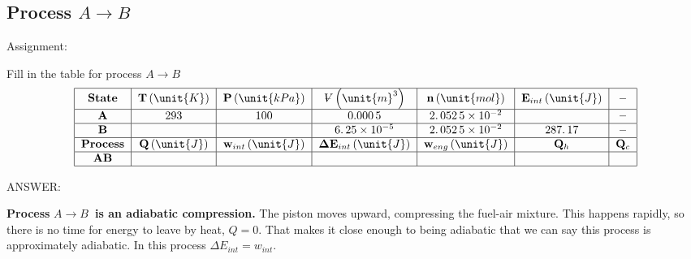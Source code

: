 \documentclass{article}
\begin{document}
\pagebreak

\subsection{\textbf{Process }$A\rightarrow B$}


Assignment:

Fill in the table for process $A\rightarrow B$%
\[
\begin{tabular}{|c|c|c|c|c|c|c|}
\hline
\textbf{State} & $\mathbf{T}\left( \unit{K}\right) $ & $\mathbf{P}\left( 
\unit{kPa}\right) $ & $%
\ooalign{\hfil$V$\hfil\cr\kern0.1em--\hfil\cr}%
\left( \unit{m}^{3}\right) $ & $\mathbf{n}\left( \unit{mol}\right) $ & $%
\mathbf{E}_{int}\left( \unit{J}\right) $ & \textbf{--} \\ \hline
$\mathbf{A}$ & $293$ & $100$ & $0.000\,5$ & $2.\,052\,5\times 10^{-2}$ &  & 
\textbf{--} \\ \hline
$\mathbf{B}$ &  &  & $6.\,25\times 10^{-5}$ & $2.\,052\,5\times 10^{-2}$ & $%
287.\,\allowbreak 17$ & \textbf{--} \\ \hline
\textbf{Process} & $\mathbf{Q}\left( \unit{J}\right) $ & $\mathbf{w}%
_{int}\left( \unit{J}\right) $ & $\mathbf{\Delta E}_{int}\left( \unit{J}%
\right) $ & $\mathbf{w}_{eng}\left( \unit{J}\right) $ & $\mathbf{Q}_{h}$ & $%
\mathbf{Q}_{c}$ \\ \hline
$\mathbf{AB}$ &  &  &  &  &  &  \\ \hline
\end{tabular}%
\]

ANSWER:

\textbf{Process }$A\rightarrow B$\textbf{\ is an adiabatic compression.} The
piston moves upward, compressing the fuel-air mixture. This happens rapidly,
so there is no time for energy to leave by heat, $Q=0.$ That makes it close
enough to being adiabatic that we can say this process is approximately
adiabatic. In this process $\Delta E_{int}=w_{int}.$
\end{document}
